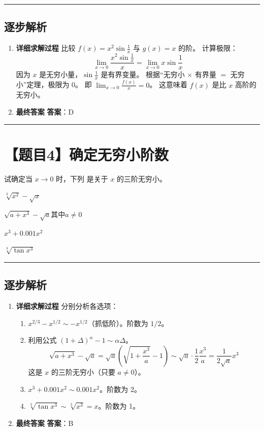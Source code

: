 \documentclass[UTF8]{ctexart}
\newenvironment{redenv}{\color{red}}{}
\newenvironment{detailedanalysis}{%
    \color{red}
    \begin{enumerate}[label=\textbf{第\arabic*步：}, leftmargin=*, align=left, itemsep=1.5ex]
}{%
    \end{enumerate}
}
\newcommand{\problemrule}{\noindent\rule{\textwidth}{1.5pt}\vspace{-0.8em}}
\newcommand{\analysisrule}{\noindent\rule{\textwidth}{0.8pt}\vspace{-0.8em}}
\newcommand{\choicesTwo}[4]{
    \begin{enumerate}[label=\Alph*., itemsep=0pt, parsep=0pt, topsep=5pt, labelsep=0.5em]
        \begin{minipage}{0.45\linewidth} \item #1 \end{minipage}
        \begin{minipage}{0.45\linewidth} \item #2 \end{minipage}
        \begin{minipage}{0.45\linewidth} \item #3 \end{minipage}
        \begin{minipage}{0.45\linewidth} \item #4 \end{minipage}
    \end{enumerate}
}
\newcommand{\blank}[1]{\underline{\hspace{#1}}}
\begin{document}
\begin{redenv}
\analysisrule
\subsection*{逐步解析}

\begin{detailedanalysis}
\item \textbf{详细求解过程}
比较 $f(x) = x^2 \sin \frac{1}{x}$ 与 $g(x) = x$ 的阶。
计算极限：
$$ \lim_{x \to 0} \frac{x^2 \sin \frac{1}{x}}{x} = \lim_{x \to 0} x \sin \frac{1}{x} $$
因为 $x$ 是无穷小量，$\sin \frac{1}{x}$ 是有界变量。
根据“无穷小 $\times$ 有界量 $=$ 无穷小”定理，极限为 0。
即 $\lim_{x \to 0} \frac{f(x)}{x} = 0$。
这意味着 $f(x)$ 是比 $x$ 高阶的无穷小。

\item \textbf{最终答案}
\textbf{答案}：D
\end{detailedanalysis}
\end{redenv}

\problemrule
\section*{【题目4】确定无穷小阶数}
试确定当 $ x \rightarrow 0 $ 时，下列 \blank{1cm} 是关于 $x$ 的三阶无穷小。
\choicesTwo
{$ \sqrt[3]{x^{2}} - \sqrt{x} $}
{$ \sqrt{a + x^{3}} - \sqrt{a} 其中 a \neq 0 $}
{$ x^{3}+0.001x^{2} $}
{$ \sqrt[3]{\tan x^{3}} $}

\begin{redenv}
\analysisrule
\subsection*{逐步解析}

\begin{detailedanalysis}
\item \textbf{详细求解过程}
分别分析各选项：
\begin{enumerate}[label=\Alph*.]
\item $x^{2/3} - x^{1/2} \sim -x^{1/2}$（抓低阶）。阶数为 $1/2$。
\item 利用公式 $(1+\Delta)^\alpha - 1 \sim \alpha \Delta$。
$$ \sqrt{a+x^3} - \sqrt{a} = \sqrt{a}(\sqrt{1+\frac{x^3}{a}} - 1) \sim \sqrt{a} \cdot \frac{1}{2}\frac{x^3}{a} = \frac{1}{2\sqrt{a}} x^3 $$
这是 $x$ 的三阶无穷小（只要 $a \neq 0$）。
\item $x^3 + 0.001x^2 \sim 0.001x^2$。阶数为 2。
\item $\sqrt[3]{\tan x^3} \sim \sqrt[3]{x^3} = x$。阶数为 1。
\end{enumerate}

\item \textbf{最终答案}
\textbf{答案}：B
\end{detailedanalysis}
\end{redenv}
\end{document}
